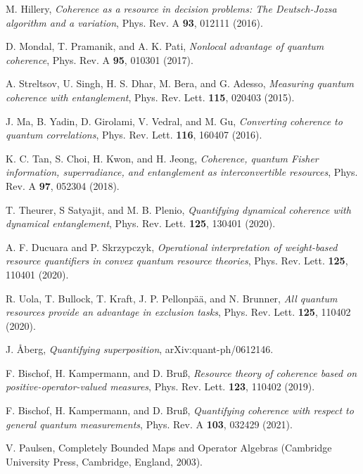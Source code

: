 \documentclass[american,aps,pra,reprint, superscriptaddress]{revtex4-1}
\theoremstyle{plain}
\theoremstyle{definition}
\theoremstyle{remark}
\begin{document}
\begin{thebibliography}{99}
 M. Hillery, {\it Coherence as a resource in decision problems: The Deutsch-Jozsa algorithm and a variation}, Phys. Rev. A {\bf 93}, 012111 (2016).

 D. Mondal, T. Pramanik, and A. K. Pati, {\it Nonlocal advantage
of quantum coherence}, Phys. Rev. A {\bf 95}, 010301 (2017).

 A. Streltsov, U. Singh, H. S. Dhar, M. Bera, and G. Adesso, {\it Measuring quantum coherence with entanglement}, Phys. Rev. Lett. {\bf 115}, 020403 (2015).

 J. Ma, B. Yadin, D. Girolami, V. Vedral, and M. Gu, {\it Converting coherence to quantum correlations}, Phys. Rev. Lett. {\bf 116}, 160407 (2016).

 K. C. Tan, S. Choi, H. Kwon, and H. Jeong, {\it Coherence, quantum Fisher information, superradiance, and entanglement as interconvertible resources}, Phys. Rev. A {\bf 97}, 052304 (2018).

 T. Theurer, S Satyajit, and M. B. Plenio, {\it Quantifying dynamical coherence with dynamical entanglement}, Phys. Rev. Lett. {\bf 125}, 130401 (2020).

 A. F. Ducuara and P. Skrzypczyk, {\it Operational interpretation of weight-based resource quantifiers in convex quantum resource theories}, Phys. Rev. Lett. {\bf 125}, 110401 (2020).

 R. Uola, T. Bullock, T. Kraft, J. P. Pellonp\"{a}\"{a}, and N. Brunner, {\it All quantum resources provide an advantage in exclusion tasks}, Phys. Rev. Lett. {\bf 125}, 110402 (2020).

 J. {\AA}berg, {\it Quantifying superposition}, arXiv:quant-ph/0612146.

 F. Bischof, H. Kampermann, and D. Bru{\ss}, {\it Resource theory of coherence based on positive-operator-valued measures}, Phys. Rev. Lett. {\bf 123}, 110402 (2019).

 F. Bischof, H. Kampermann, and D. Bru{\ss}, {\it Quantifying coherence with respect to general quantum measurements}, Phys. Rev. A {\bf 103}, 032429 (2021).


 V. Paulsen, Completely Bounded Maps and Operator Algebras (Cambridge University Press, Cambridge, England, 2003).


\end{thebibliography}
\end{document}
